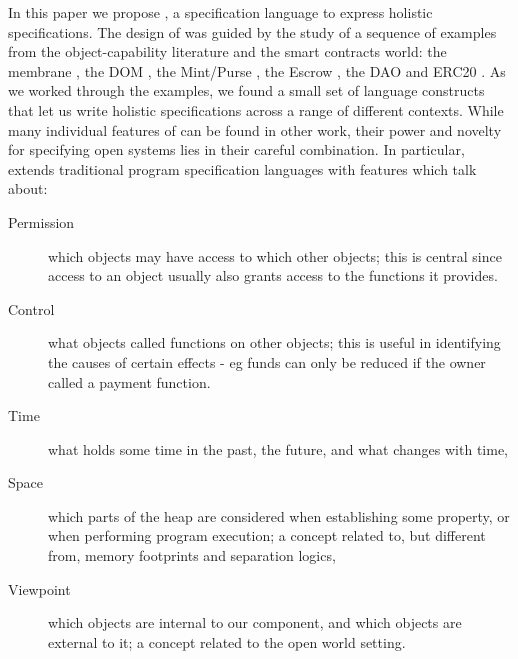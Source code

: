 In this paper we propose \Chainmail, a specification language to
express holistic specifications.
The design of \Chainmail was guided by the study of a sequence of
examples from the object-capability literature and the smart contracts world: the
membrane \cite{membranesJavascript}, the DOM \cite{dd,ddd}, the Mint/Purse \cite{MillerPhD}, the Escrow \cite{proxiesECOOP2013}, the DAO \cite{Dao,DaoBug} and
ERC20 \cite{ERC20}.  As we worked through the
examples, we found a small set of language constructs that let us
write holistic specifications across a range of different contexts.
%
While many individual features of \Chainmail can be found in other work, 
their power and novelty for specifying open systems lies in their careful combination.
In particular, \Chainmail extends 
traditional program specification languages \cite{Leavens-etal07,Meyer92} with features which talk about:
%
\begin{description}
\item[Permission] 
which objects may have access to which other objects; 
this is central since access to an object usually also grants access to the functions it provides.
%
\item[Control]
what objects called functions on other objects; this
 is useful in identifying the causes of certain effects - eg 
funds can only be reduced if the owner called a payment function.
%
%
\item[Time]
what holds some time in  the past, the future, and what changes with time,
\item[Space]
which parts of the heap are considered when establishing some property, or when 
performing program execution; a concept
related to, but different from, memory footprints and separation logics,
\item[Viewpoint]
which objects are internal to our component, and which objects are
external to it;
a concept related to the open world setting.
\end{description}

